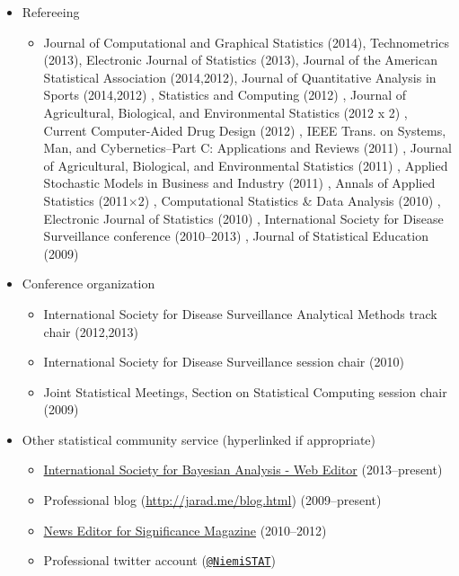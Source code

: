 \documentclass[overlapped,line]{res}
\begin{document}
\begin{resume}
\begin{itemize}
\item Refereeing
 \begin{itemize}
 \item Journal of Computational and Graphical Statistics (2014), Technometrics (2013), Electronic Journal of Statistics (2013), Journal of the American Statistical Association (2014,2012), Journal of Quantitative Analysis in Sports (2014,2012)
 , Statistics and Computing (2012)
 , Journal of Agricultural, Biological, and Environmental Statistics (2012 x 2)
 , Current Computer-Aided Drug Design (2012)
 , IEEE Trans. on Systems, Man, and Cybernetics--Part C: Applications and Reviews (2011)
 , Journal of Agricultural, Biological, and Environmental Statistics (2011)
 , Applied Stochastic Models in Business and Industry (2011)
 , Annals of Applied Statistics  (2011$\times 2$)
 , Computational Statistics \& Data Analysis (2010)
 , Electronic Journal of Statistics (2010)
 , International Society for Disease Surveillance conference (2010--2013)
 , Journal of Statistical Education (2009)
 \end{itemize}
\item Conference organization
 \begin{itemize}
 \item International Society for Disease Surveillance Analytical Methods track chair (2012,2013)
 \item International Society for Disease Surveillance session chair (2010)
 \item Joint Statistical Meetings, Section on Statistical Computing session chair (2009)
 \end{itemize}
\item Other statistical community service (hyperlinked if appropriate)
 \begin{itemize}
 \item \href{http://bayesian.org/}{International Society for Bayesian Analysis -  Web Editor} (2013--present)
 \item Professional blog (\url{http://jarad.me/blog.html}) (2009--present)
 \item \href{http://www.significancemagazine.org/view/searchResults.html?s=&t=&q=jarad+niemi}{News Editor for Significance Magazine} (2010--2012)
 \item Professional twitter account ({\tt \href{https://twitter.com/NiemiSTAT}{@NiemiSTAT}})
 \end{itemize}


\end{itemize}
\end{resume}
\end{document}
